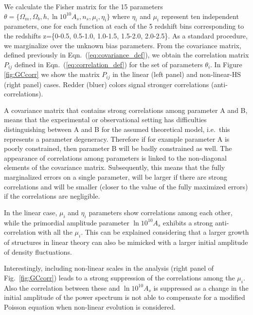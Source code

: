 We calculate the Fisher matrix for the 15 parameters
$\theta=\{\Omega_{m},\Omega_{b},h,\ln10^{10}A_{s},n_{s},\mu_{i},\eta_{i}\}$
where $\eta_{i}$ and $\mu_{i}$ represent ten independent parameters, one for each function
at each of the 5 redshift bins corresponding to the redshifts z=\{0-0.5, 0.5-1.0, 1.0-1.5, 1.5-2.0, 2.0-2.5\}. As a standard procedure, we marginalize over the unknown bias parameters.
From the covariance matrix, defined
previously in Eqn.\ (\ref{eq:covariance_def}), we obtain the correlation
matrix $P_{ij}$ defined in Eqn.\ (\ref{eq:correlation_def}) for the
set of parameters $\theta_{i}$. In Figure \ref{fig:GCcorr} we show
the matrix $P_{ij}$ in the linear (left panel) and non-linear-HS
(right panel) cases. Redder (bluer) colors signal stronger correlations
(anti-correlations). 

A covariance matrix that contains strong correlations among parameter A and B, means that the 
experimental or observational setting has difficulties distinguishing between A and B for the assumed theoretical model, i.e.\ this represents a parameter degeneracy.
Therefore if for example parameter A is poorly constrained, then parameter B will be badly constrained as well.
The appearance of correlations among parameters is linked to the non-diagonal elements of the covariance matrix. Subsequently, this means that
the fully marginalized errors on a single parameter, will be larger if there are strong correlations and will be smaller (closer to the value of the
fully maximized errors) if the correlations are negligible.

In the linear case, $\mu_{i}$ and $\eta_{i}$ parameters show correlations
among each other, while the primordial
 amplitude parameter $\ln10^{10}A_{s}$ exhibits a strong anti-correlation with all the $\mu_{i}$.
This can be explained considering that a larger growth of
structures in linear theory can also be mimicked with a larger initial
amplitude of density fluctuations.

Interestingly, including non-linear scales in the analysis (right panel of Fig.\ \ref{fig:GCcorr})
leads to a strong suppression of the correlations among the $\mu_i$.
Also the correlation between these and $\ln10^{10}A_{s}$ is suppressed
as a change in the initial amplitude of the power spectrum is not able
to compensate for a modified Poisson equation when non-linear evolution 
is considered.

